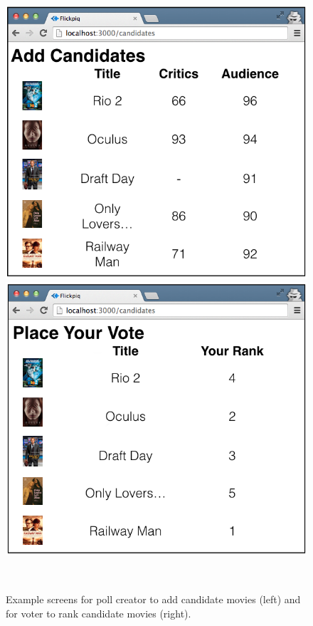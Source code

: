 \documentclass[12pt,letterpaper]{article} %
\begin{document}
\begin{figure}[h!]
 \begin{center}
  \begin{minipage}{0.45\textwidth}
    \begin{center}
      \includegraphics[scale=0.25]{../graphics/add-candidates.png}
    \end{center}
  \end{minipage}
  \hspace{0.05\textwidth}
  \begin{minipage}{0.45\textwidth}
    \begin{center}
      \includegraphics[scale=0.25]{../graphics/place-vote.png}
    \end{center}
  \end{minipage} \\
  \caption{Example screens for poll creator to add candidate movies (left) and for voter to rank candidate movies (right).}
  \label{example-screens}
 \end{center}
\end{figure}
\end{document}
